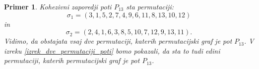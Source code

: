 \documentclass[a4paper, 12pt]{book}
\newtheorem{primer}{Primer}[chapter]
\begin{document}
                


\begin{primer}
Kohezivni zaporedji poti $P_{13}$ sta permutaciji:
\[
    \sigma_1 = (3, 1, 5, 2, 7, 4, 9, 6, 11, 8, 13, 10, 12)
\] 
in 
\[
    \sigma_2 = (2, 4, 1, 6, 3, 8, 5, 10, 7, 12, 9, 13, 11).
\]
Vidimo, da obstajata vsaj dve permutaciji, katerih permutacijski graf je pot $P_{13}$. V izreku \ref{izrek_dve_permutaciji_poti} bomo pokazali, da sta to tudi edini permutaciji, katerih permutacijski graf je pot $P_{13}$.
\end{primer}



\end{document}
